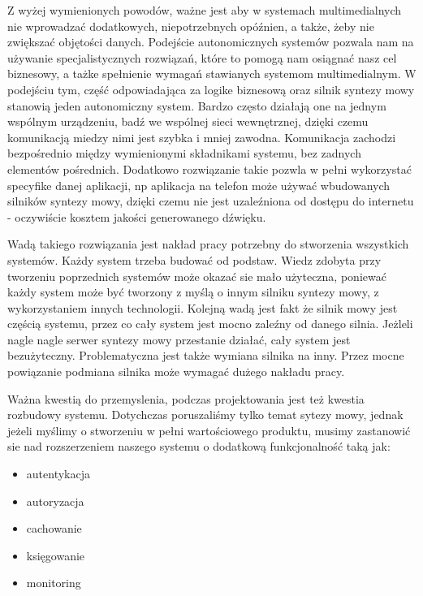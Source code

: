 Z wyżej wymienionych powodów, ważne jest aby w systemach multimedialnych nie wprowadzać dodatkowych, niepotrzebnych opóźnien, a także, żeby nie zwiększać objętości danych. Podejście autonomicznych systemów pozwala nam na używanie specjalistycznych rozwiązań, które to pomogą nam osiągnać nasz cel biznesowy, a tażke spełnienie wymagań stawianych systemom multimedialnym. W podejściu tym, część odpowiadająca za logike biznesową oraz silnik syntezy mowy stanowią jeden autonomiczny system. Bardzo często działają one na jednym wspólnym urządzeniu, badź we wspólnej sieci wewnętrznej, dzięki czemu komunikacją miedzy nimi jest szybka i mniej zawodna. Komunikacja zachodzi bezpośrednio między wymienionymi składnikami systemu, bez zadnych elementów pośrednich. Dodatkowo rozwiązanie takie pozwla w pełni wykorzystać specyfike danej aplikacji, np aplikacja na telefon może używać wbudowanych silników syntezy mowy, dzięki czemu nie jest uzaleźniona od dostępu do internetu - oczywiście  kosztem jakości generowanego dźwięku. 


Wadą takiego rozwiązania jest nakład pracy potrzebny do stworzenia wszystkich systemów. Każdy system trzeba budować od podstaw. Wiedz zdobyta przy tworzeniu poprzednich systemów może okazać sie mało użyteczna, poniewać każdy system może być tworzony z myślą o innym silniku syntezy mowy,  z wykorzystaniem innych technologii. Kolejną wadą jest fakt że silnik mowy jest częścią systemu, przez co cały system jest mocno zaleźny od danego silnia. Jeżleli nagle nagle serwer syntezy mowy przestanie działać, cały system jest bezużyteczny. Problematyczna jest także wymiana silnika na inny. Przez mocne powiązanie podmiana silnika może wymagać dużego nakładu pracy. 

Ważna kwestią do przemyslenia, podczas projektowania jest też kwestia rozbudowy systemu. Dotychczas poruszaliśmy tylko temat sytezy mowy,  jednak jeżeli myślimy o stworzeniu w pełni wartościowego produktu, musimy zastanowić sie nad rozszerzeniem naszego systemu o dodatkową funkcjonalność taką jak:

\label{list:uslugi}
\begin{itemize}
	\item autentykacja
	\item autoryzacja
	\item cachowanie
	\item księgowanie
	\item monitoring
\end{itemize}

